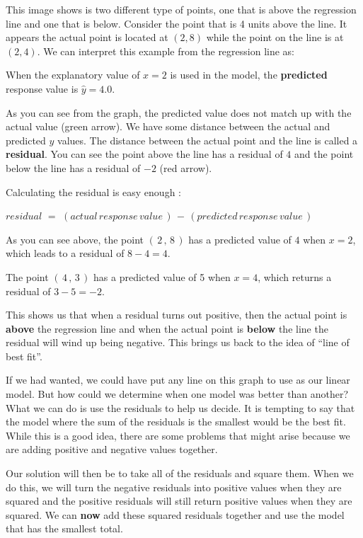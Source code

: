 \documentclass[
  letterpaper,
  DIV=11,
  numbers=noendperiod]{scrreprt}
\begin{document}
This image shows is two different type of points, one that is above the
regression line and one that is below. Consider the point that is 4
units above the line. It appears the actual point is located at
\((2, 8)\) while the point on the line is at \((2, 4)\). We can
interpret this example from the regression line as:

When the explanatory value of \(x = 2\) is used in the model, the
\textbf{predicted} response value is \(\hat{y} = 4.0\).

As you can see from the graph, the predicted value does not match up
with the actual value (green arrow). We have some distance between the
actual and predicted \(y\) values. The distance between the actual point
and the line is called a \textbf{residual}. You can see the point above
the line has a residual of \(4\) and the point below the line has a
residual of \(-2\) (red arrow).

Calculating the residual is easy enough :

\(residual \,\, = \,\, (actual \, response\, value\,) \, - \, (predicted
\, response\, value \,)\)

As you can see above, the point \((\,2\, , \,8\,)\) has a predicted
value of \(4\) when \(x=2\), which leads to a residual of \(8-4 =4\).

The point \((\,4\, , \, 3 \,)\) has a predicted value of 5 when \(x=4\),
which returns a residual of \(3 - 5 = -2\).

This shows us that when a residual turns out positive, then the actual
point is \textbf{above} the regression line and when the actual point is
\textbf{below} the line the residual will wind up being negative. This
brings us back to the idea of ``line of best fit''.

If we had wanted, we could have put any line on this graph to use as our
linear model. But how could we determine when one model was better than
another? What we can do is use the residuals to help us decide. It is
tempting to say that the model where the sum of the residuals is the
smallest would be the best fit. While this is a good idea, there are
some problems that might arise because we are adding positive and
negative values together.

Our solution will then be to take all of the residuals and square them.
When we do this, we will turn the negative residuals into positive
values when they are squared and the positive residuals will still
return positive values when they are squared. We can \textbf{now} add
these squared residuals together and use the model that has the smallest
total.
\end{document}
